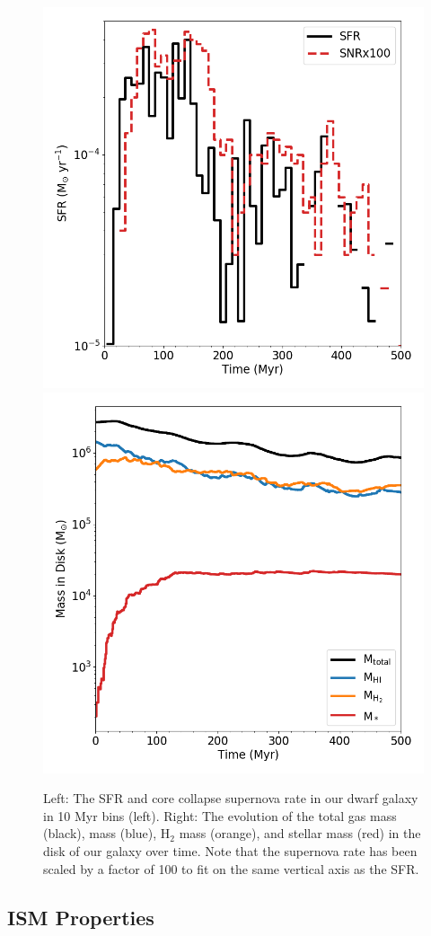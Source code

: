 \documentclass[twocolumn]{aastex61}
\begin{document}
\begin{figure}
\centering
\includegraphics[width=0.475\linewidth]{sfr_snrx100}
\includegraphics[width=0.475\linewidth]{mass_evolution}
\caption{Left: The SFR and core collapse supernova rate in our dwarf galaxy in 10 Myr bins (left). Right: The evolution of the total gas mass (black),  mass (blue), H$_2$ mass (orange), and stellar mass (red) in the disk of our galaxy over time. 
   Note that the supernova rate has been scaled by a factor of 100 to fit on the same vertical 
   axis as the SFR.}
\label{fig:sfr_mass_evolution}
\end{figure}

\subsection{ISM Properties}
\end{document}
